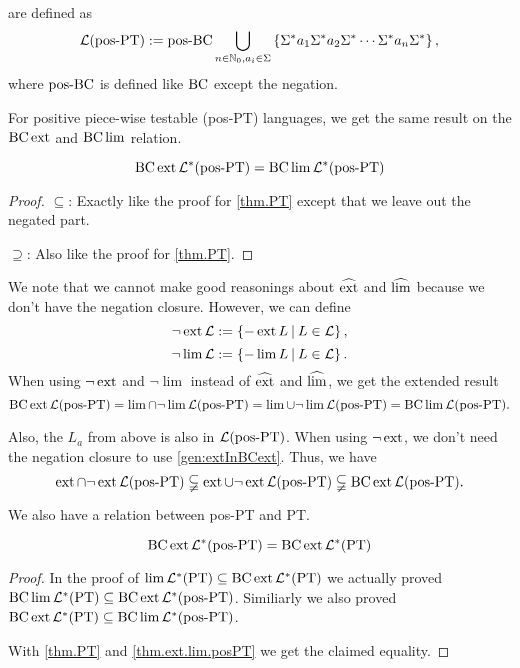 \

\label{lang:posPT}
 are defined as
\[ \Lang(\posPT) := \posBC \bigcup_{n\in\N_0,a_i \in \Sigma} \Set{\Sigma^* a_1 \Sigma^* a_2 \Sigma^* \cdots\Sigma^* a_n \Sigma^*} , \]
where $\operatorname{pos-BC}$ is defined like $\operatorname{BC}$ except the negation.

For positive piece-wise testable (pos-PT) languages, we get the same result on the $\operatorname{BC} \operatorname{ext}$ and $\operatorname{BC} \lim$ relation.

\begin{theorem}
\label{thm.ext.lim.posPT}
\[ \operatorname{BC} \operatorname{ext} \mathcal{L}^* (\textup{\textrm{pos-PT}}) = \operatorname{BC} \lim \mathcal{L}^* (\textup{\textrm{pos-PT}}) \]
\begin{proof}
$\subseteq$: Exactly like the proof for \cref{thm.PT} except that we leave out the negated part.

$\supseteq$: Also like the proof for \cref{thm.PT}.
\end{proof}
\end{theorem}

We note that we cannot make good reasonings about $\operatorname{\widehat{ext}}$ and $\operatorname{\widehat{lim}}$ because we don't have the negation closure. However, we can define
\[ \neg\ext \Lang := \Set{-\ext L}{L \in \Lang} , \]
\[ \neg\lim \Lang := \Set{-\lim L}{L \in \Lang} . \]
When using $\neg\operatorname{ext}$ and $\neg\lim$ instead of $\operatorname{\widehat{ext}}$ and $\operatorname{\widehat{lim}}$, we get the extended result
\[ \operatorname{BC} \operatorname{ext} \mathcal{L}(\textup{\textrm{pos-PT}}) =
\lim \cap \neg\lim \mathcal{L}(\textup{\textrm{pos-PT}}) =
\lim \cup \neg\lim \mathcal{L}(\textup{\textrm{pos-PT}}) =
\operatorname{BC} \lim \mathcal{L}(\textup{\textrm{pos-PT}}) .\]

Also, the $L_a$ from above is also in $\mathcal{L}(\textup{\textrm{pos-PT}})$. When using $\neg\operatorname{ext}$, we don't need the negation closure to use \cref{gen:extInBCext}. Thus, we have
\[ \operatorname{ext} \cap \neg\operatorname{ext} \mathcal{L}(\textup{\textrm{pos-PT}}) \subsetneqq
\operatorname{ext} \cup \neg\operatorname{ext} \mathcal{L}(\textup{\textrm{pos-PT}}) \subsetneqq
\operatorname{BC} \operatorname{ext} \mathcal{L}(\textup{\textrm{pos-PT}}) . \]

We also have a relation between pos-PT and PT.

\begin{lemma}
\[ \operatorname{BC} \operatorname{ext} \mathcal{L}^*(\textup{\textrm{pos-PT}}) = \operatorname{BC} \operatorname{ext} \mathcal{L}^* (\textup{\textrm{PT}}) \]

\begin{proof}
In the proof of $\lim \mathcal{L}^*(\textup{\textrm{PT}}) \subseteq \operatorname{BC} \operatorname{ext} \mathcal{L}^* (\textup{\textrm{PT}})$ we actually proved $\operatorname{BC} \lim \mathcal{L}^*(\textup{\textrm{PT}}) \subseteq \operatorname{BC} \operatorname{ext} \mathcal{L}^* (\textup{\textrm{pos-PT}})$. Similiarly we also proved $\operatorname{BC} \operatorname{ext} \mathcal{L}^* (\textup{\textrm{PT}}) \subseteq \operatorname{BC} \lim \mathcal{L}^* (\textup{\textrm{pos-PT}})$.

With \cref{thm.PT} and \cref{thm.ext.lim.posPT} we get the claimed equality.
\end{proof}
\end{lemma}

